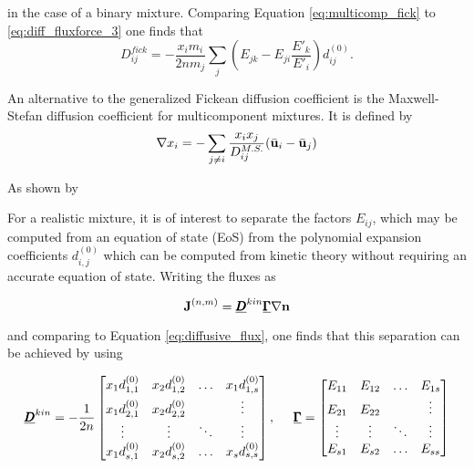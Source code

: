 in the case of a binary mixture. Comparing Equation \eqref{eq:multicomp_fick} to \eqref{eq:diff_fluxforce_3} one finds that
\begin{equation}
    D_{ij}^{fick} = - \frac{x_i m_i }{2n m_j} \sum_j (E_{jk} - E_{ji} \frac{E'_k}{E'_i}) d_{ij}^{(0)}.
    \label{eq:fick_diffusion_coeff}
\end{equation}

An alternative to the generalized Fickean diffusion coefficient is the Maxwell-Stefan diffusion coefficient for multicomponent mixtures. It is defined by
\begin{equation}
    \nabla x_i = - \sum_{j \neq i} \frac{x_i x_j}{D_{ij}^{M.S.}} (\Bar{\boldsymbol{\mathrm{u}}}_i - \Bar{\boldsymbol{\mathrm{u}}}_j)
\end{equation}

As shown by 

For a realistic mixture, it is of interest to separate the factors $E_{ij}$, which may be computed from an equation of state (EoS) from the polynomial expansion coefficients $d_{i,j}^{(0)}$ which can be computed from kinetic theory without requiring an accurate equation of state. Writing the fluxes as

\begin{equation}
    \boldsymbol{\mathrm{J}}^{(n,m)} = \underline{\pmb{D}}^{kin} \underline{\pmb{\Gamma}} \nabla \boldsymbol{\mathrm{n}}
\end{equation}

and comparing to Equation \eqref{eq:diffusive_flux}, one finds that this separation can be achieved by using

\begin{equation}
    \underline{\pmb{D}}^{kin} = - \frac{1}{2n}
    \begin{bmatrix}
        x_1 d_{1,1}^{(0)} & x_2 d_{1,2}^{(0)} & \hdots & x_1 d_{1,s}^{(0)} \\
        x_1 d_{2,1}^{(0)} & x_2 d_{2,2}^{(0)} & & \vdots \\
        \vdots & \vdots & \ddots & \vdots \\
        x_1 d_{s,1}^{(0)} & x_2 d_{s,2}^{(0)} & \hdots & x_s d_{s,s}^{(0)}
    \end{bmatrix}
    , \hspace{.5cm}
    \underline{\pmb{\Gamma}} = 
    \begin{bmatrix}
        E_{11} & E_{12} & \hdots & E_{1s} \\
        E_{21} & E_{22} & & \vdots \\
        \vdots & \vdots & \ddots & \vdots \\
        E_{s1} & E_{s2} & \hdots & E_{ss}
    \end{bmatrix}
\end{equation}

